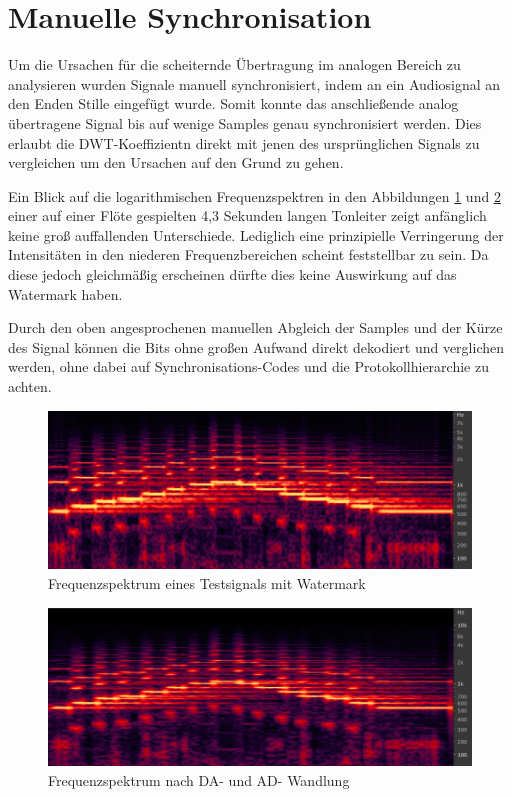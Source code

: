 \section{Manuelle Synchronisation}

Um die Ursachen für die scheiternde Übertragung im analogen Bereich zu analysieren wurden Signale manuell synchronisiert, indem an ein Audiosignal an den Enden Stille eingefügt wurde. Somit konnte das anschließende analog übertragene Signal bis auf wenige Samples genau synchronisiert werden. Dies erlaubt die DWT-Koeffizientn direkt mit jenen des ursprünglichen Signals zu vergleichen um den Ursachen auf den Grund zu gehen. 

Ein Blick auf die logarithmischen Frequenzspektren in den Abbildungen \ref{fig:spektrum-original} und \ref{fig:spektrum-soundkarte} einer auf einer Flöte gespielten 4,3 Sekunden langen Tonleiter zeigt anfänglich keine groß auffallenden Unterschiede. Lediglich eine prinzipielle Verringerung der Intensitäten in den niederen Frequenzbereichen scheint feststellbar zu sein. Da diese jedoch gleichmäßig erscheinen dürfte dies keine Auswirkung auf das Watermark haben. 

Durch den oben angesprochenen manuellen Abgleich der Samples und der Kürze des Signal können die Bits ohne großen Aufwand direkt dekodiert und verglichen werden, ohne dabei auf Synchronisations-Codes und die Protokollhierarchie zu achten.

\newpage

\begin{figure}[h]
	\centering
	\includegraphics[width=\textwidth]{figures/spektrum-original.png}
	\caption{Frequenzspektrum eines Testsignals mit Watermark}
	\label{fig:spektrum-original}
\end{figure}

\begin{figure}[h]
	\centering
	\includegraphics[width=\textwidth]{figures/spektrum-soundkarte.png}
	\caption{Frequenzspektrum nach DA- und AD- Wandlung}
	\label{fig:spektrum-soundkarte}
\end{figure}

